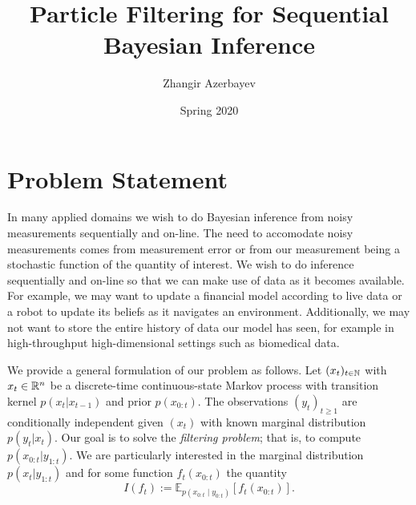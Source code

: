 \documentclass{article}
\title{Particle Filtering for Sequential Bayesian Inference}
\author{Zhangir Azerbayev}
\date{Spring 2020}
\numberwithin{equation}{section}
\begin{document}
\maketitle

\section{Problem Statement}
In many applied domains we wish to do Bayesian inference from noisy measurements sequentially and on-line. The
need to accomodate noisy measurements comes from measurement error or from our measurement being a stochastic
function of the quantity of interest. We wish to do inference sequentially and on-line so that we can make use of data
as it becomes available. For example, we may want to update a financial model according to live data or a robot to
update its
beliefs as it navigates an environment. Additionally, we may not want to store the entire history of data our model has
seen, for example in high-throughput high-dimensional settings such as biomedical data. 

We provide a general formulation of our problem as follows. Let $(x_t)_{t\in\mathbb{N}}$ with $x_t\in\mathbb{R}^n$ be a discrete-time continuous-state
Markov process with transition kernel $p(x_t| x_{t-1})$ and prior $p(x_{0:t})$. The observations $(y_t)_{t\geq 1}$ are conditionally
independent given $(x_t)$ with known marginal distribution $p(y_t| x_t)$. Our goal is to solve the {\it filtering
problem}; that is, to compute $p(x_{0:t}| y_{1:t})$. We are particularly interested in the marginal distribution
$p(x_t| y_{1:t})$ and for some function $f_t(x_{0:t})$ the quantity
\[I(f_t) := \mathbb{E}_{p(x_{0:t}\mid y_{0:t})}[f_t(x_{0:t})]. \]
\end{document}
